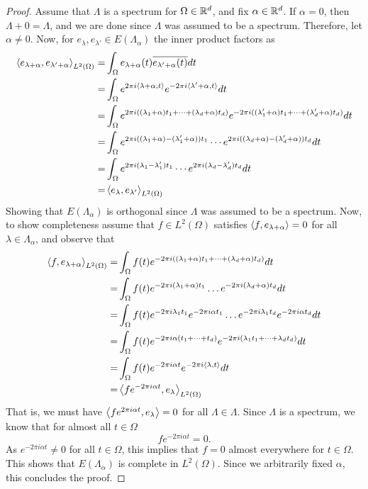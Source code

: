 \documentclass[../thesis.tex]{subfiles}
\begin{document}
\begin{proof}
    Assume that $\Lambda$ is a spectrum for $\Omega\in \mathbb{R}^d$, and fix $\alpha\in \mathbb{R}^d$. If $\alpha = 0$, then $\Lambda + 0 = \Lambda$, and we are done since $\Lambda$ was assumed to be a spectrum. Therefore, let $\alpha\neq 0$. Now, for $e_{\lambda},e_{\lambda'} \in E(\Lambda_\alpha)$ the inner product factors as 
    \begin{align*}
        \left \langle e_{\lambda+\alpha},e_{\lambda'+\alpha} \right \rangle_{L^2(\Omega)} =& \int_{\Omega} e_{\lambda+\alpha}(t)\overline{e_{\lambda'+\alpha}(t)} dt\\
        =& \int_{\Omega} e^{2\pi i \langle\lambda+\alpha,t\rangle} e^{-2 \pi i \langle\lambda'+\alpha,t\rangle} dt\\
        =& \int_{\Omega} e^{2\pi i  ((\lambda_1+\alpha)t_1 + \dots +(\lambda_d+\alpha) t_d)} e^{-2\pi i  ((\lambda_1'+\alpha) t_1 + \dots +(\lambda_d'+\alpha) t_d)} dt\\
        =& \int_{\Omega} e^{2\pi i  ((\lambda_1+\alpha) -(\lambda_1'+\alpha))t_1} \cdots e^{2\pi i  ((\lambda_d+\alpha) -(\lambda_d'+\alpha))t_d} dt\\
        =& \int_{\Omega} e^{2\pi i  (\lambda_1 -\lambda_1')t_1} \cdots e^{2\pi i  (\lambda_d -\lambda_d')t_d} dt\\
        =& \left \langle e_{\lambda},e_{\lambda'} \right \rangle_{L^2(\Omega)}
    \end{align*}
    Showing that $E(\Lambda_\alpha)$ is orthogonal since $\Lambda$ was assumed to be a spectrum. Now, to show completeness assume that $f\in L^2(\Omega)$ satisfies $\left \langle f,e_{\lambda + \alpha} \right \rangle = 0$ for all $\lambda\in \Lambda_\alpha$, and observe that
    \begin{align*}
        \left \langle f,e_{\lambda+\alpha} \right \rangle_{L^2(\Omega)} =& \int_{\Omega} f(t) e^{-2\pi i  ((\lambda_1+\alpha) t_1 + \dots +(\lambda_d+\alpha) t_d)} dt\\
        =& \int_{\Omega} f(t) e^{-2\pi i  (\lambda_1+\alpha)t_1} \dots e^{-2\pi i  (\lambda_d+\alpha)t_d} dt\\
        =& \int_{\Omega} f(t) e^{-2\pi i  \lambda_1 t_1}e^{-2\pi i  \alpha t_1} \dots e^{-2\pi i  \lambda_1 t_d}e^{-2\pi i  \alpha t_d} dt\\
        =& \int_{\Omega} f(t) e^{-2\pi i  \alpha (t_1 + \dots + t_d) }  e^{-2\pi i  (\lambda_1t_1 + \dots + \lambda_d t_d)}dt\\
        =& \int_{\Omega} f(t) e^{-2\pi i \alpha t }  e^{-2\pi i  \langle\lambda, t\rangle}dt\\
        =& \left \langle f e^{-2\pi i  \alpha t },e_{\lambda} \right \rangle_{L^2(\Omega)}
    \end{align*}
    That is, we must have $\left \langle f e^{2\pi i  \alpha t },e_{\lambda} \right \rangle = 0$ for all $\Lambda \in \Lambda$. Since $\Lambda$ is a spectrum, we know that for almost all $t \in \Omega$ 
    \begin{equation*}
        f e^{-2 \pi i \alpha t} = 0.
    \end{equation*}
    As $e^{-2 \pi i \alpha t} \neq 0$ for all $t\in \Omega$, this implies that $f = 0$ almost everywhere for $t\in \Omega$. This shows that $E(\Lambda_\alpha)$ is complete in $L^2(\Omega)$. Since we arbitrarily fixed $\alpha$, this concludes the proof. 
\end{proof}
\end{document}
